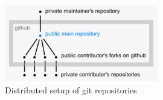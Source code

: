 \begin{figure}[htb]
	\centering
	\includegraphics[width=0.6\textwidth]{prestudy/github.jpg}
	\caption{Distributed setup of git repositories\cite{git:repositories}}
	\label{fig:github}
\end{figure}

\newpage
